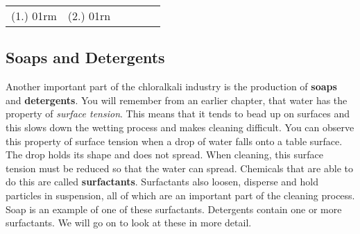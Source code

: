 {\begin{enumerate}
\end{enumerate}

\par \practiceinfo
\par \begin{tabular}[h]{cccccc}
(1.)	01rm	&
(2.)	01rn	&
\end{tabular}
}

\subsection{Soaps and Detergents}

Another important part of the chloralkali industry is the production of \textbf{soaps} and \textbf{detergents}. You will remember from an earlier chapter, that water has the property of \textit{surface tension}. This means that it tends to bead up on surfaces and this slows down the wetting process and makes cleaning difficult. You can observe this property of surface tension when a drop of water falls onto a table surface. The drop holds its shape and does not spread. When cleaning, this surface tension must be reduced so that the water can spread. Chemicals that are able to do this are called \textbf{surfactants}. Surfactants also loosen, disperse and hold particles in suspension, all of which are an important part of the cleaning process. Soap is an example of one of these surfactants. Detergents contain one or more surfactants. We will go on to look at these in more detail.


